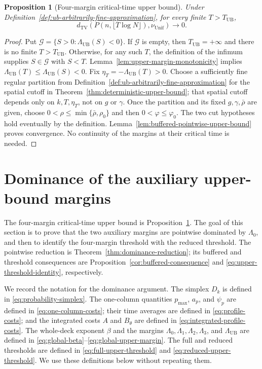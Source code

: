 \documentclass[11pt]{article}
\numberwithin{equation}{section}
\newtheorem{proposition}[proposition]{Proposition}
\newcommand{\TV}{\mathrm{TV}}
\newcommand{\Unif}{\mathrm{Unif}}
\newcommand{\1}{\mathbf 1}
\newcommand{\nuUnif}{\nu_{\Unif}}
\newcommand{\UB}{\mathrm{UB}}
\begin{document}
\begin{proposition}[Four-margin critical-time upper bound]
\label{cor:full-margin-critical-upper-bound}
Under Definition~\ref{def:ub-arbitrarily-fine-approximation}, for every
finite $T>T_{\UB}$,
\[
 d_{\TV}(P(n,\lfloor T\log N\rfloor),\nuUnif)\longrightarrow0.
\]
\end{proposition}
\begin{proof}
Put $\mathcal G=\{S>0:\Lambda_{\UB}(S)<0\}$.
If $\mathcal G$ is empty, then $T_{\UB}=+\infty$ and there is no
finite $T>T_{\UB}$.  Otherwise, for any such $T$, the definition of
the infimum supplies $S\in\mathcal G$ with $S<T$.
Lemma~\ref{lem:upper-margin-monotonicity} implies
$\Lambda_{\UB}(T)\le\Lambda_{\UB}(S)<0$.
Fix $\eta_T=-\Lambda_{\UB}(T)>0$.
Choose a sufficiently fine regular partition from
Definition~\ref{def:ub-arbitrarily-fine-approximation} for the spatial
cutoff in Theorem~\ref{thm:deterministic-upper-bound}; that spatial
cutoff depends only on $k,T,\eta_T$, not on $g$ or $\gamma$.
Once the partition and its fixed $g,\gamma,\bar\rho$ are given,
choose $0<\rho\le\min\{\bar\rho,\rho_0\}$ and then
$0<\varphi\le\varphi_0$.  The two cut hypotheses hold eventually
by the definition.  Lemma~\ref{lem:buffered-pointwise-upper-bound} proves convergence.
No continuity of the margins at their critical time is needed.
\end{proof}

\section{Dominance of the auxiliary upper-bound margins}
\label{sec:dominance-upper-margins}

The four-margin critical-time upper bound is
Proposition~\ref{cor:full-margin-critical-upper-bound}.  The goal of this section is
to prove that the two auxiliary margins are pointwise dominated by
$\Lambda_0$, and then to identify the four-margin threshold with the
reduced threshold.  The pointwise reduction is
Theorem~\ref{thm:dominance-reduction}; its buffered and threshold consequences
are Proposition~\ref{cor:buffered-consequence} and
\eqref{eq:upper-threshold-identity}, respectively.

We record the notation for the dominance argument.
The simplex $D_k$ is defined in \eqref{eq:probability-simplex}.  The
one-column quantities $p_{\max}$, $a_p$, and $\psi_p$ are defined in
\eqref{eq:one-column-costs}; their time averages are defined in
\eqref{eq:profile-costs}; and the integrated costs $A$ and $B_\theta$ are
defined in \eqref{eq:integrated-profile-costs}.  The whole-deck exponent
$\beta$ and the margins $\Lambda_0,\Lambda_1,\Lambda_2,\Lambda_3$, and
$\Lambda_{\UB}$ are defined in
\eqref{eq:global-beta}--\eqref{eq:global-upper-margin}.  The full and
reduced thresholds are defined in \eqref{eq:full-upper-threshold} and
\eqref{eq:reduced-upper-threshold}.  We use these definitions below
without repeating them.
\end{document}
